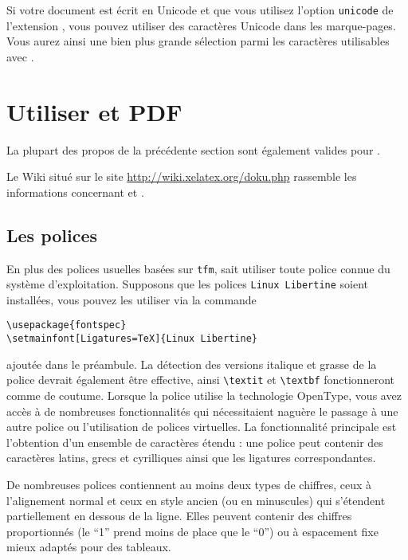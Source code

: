 Si votre document est écrit en Unicode et que vous utilisez l'option
\verb+unicode+ de l'extension , vous pouvez utiliser des
caractères Unicode dans les marque-pages. Vous aurez ainsi une bien
plus grande sélection parmi les caractères utilisables avec
.

\section{Utiliser  et PDF}
\label{sec:xetex}

%

La plupart des propos de la précédente section sont également valides
pour .

Le Wiki situé sur le site \url{http://wiki.xelatex.org/doku.php}
rassemble les informations concernant  et .

\subsection{Les polices}

En plus des polices usuelles basées sur \texttt{tfm}, 
sait utiliser toute police connue du système d'exploitation. Supposons
que les polices \texttt{Linux Libertine} soient installées, vous
pouvez les utiliser via la commande
\begin{code}
\begin{verbatim}
\usepackage{fontspec}
\setmainfont[Ligatures=TeX]{Linux Libertine}
\end{verbatim}
\end{code}
%
ajoutée dans le préambule. La détection des versions italique et
grasse de la police devrait également être effective, ainsi
\verb|\textit| et \verb|\textbf| fonctionneront comme de
coutume. Lorsque la police utilise la technologie OpenType, vous avez
accès à de nombreuses fonctionnalités qui nécessitaient naguère le
passage à une autre police ou l'utilisation de polices virtuelles. La
fonctionnalité principale est l'obtention d'un ensemble de caractères
étendu : une police peut contenir des caractères latins, grecs et
cyrilliques ainsi que les ligatures correspondantes.

De nombreuses polices contiennent au moins deux types de chiffres,
ceux à l'alignement normal et ceux en style ancien (ou en minuscules)
qui s'étendent partiellement en dessous de la ligne. Elles peuvent
contenir des chiffres proportionnés (le \enquote{1} prend moins de place
que le \enquote{0}) ou à espacement fixe mieux adaptés pour des tableaux.

